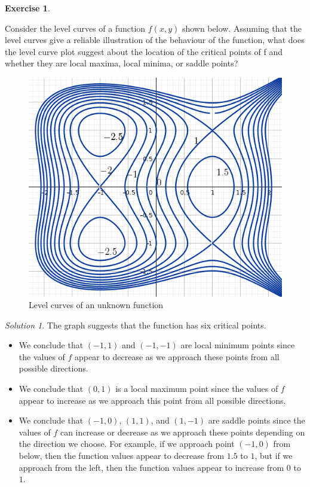 \documentclass[
]{book}
\providecommand{\tightlist}{%
  \setlength{\itemsep}{0pt}\setlength{\parskip}{0pt}}
\theoremstyle{definition}
\theoremstyle{definition}
\theoremstyle{definition}
\newtheorem{exercise}{Exercise}[chapter]
\theoremstyle{definition}
\theoremstyle{remark}
\newtheorem*{solution}{Solution}
\begin{document}
\begin{exercise}
\protect\hypertarget{exr:unlabeled-div-63}{}\label{exr:unlabeled-div-63}

Consider the level curves of a function \(f(x, y)\) shown below. Assuming that the level curves give a reliable illustration of the behaviour of the function, what does the level curve plot suggest about the location of the critical points of f and whether they are local maxima, local minima, or saddle points?

\begin{figure}

{\centering \includegraphics[width=0.4\linewidth]{images/lc-new} 

}

\caption{Level curves of an unknown function}\label{fig:unnamed-chunk-16}
\end{figure}

\end{exercise}

\begin{solution}

The graph suggests that the function has six critical points.

\begin{itemize}
\tightlist
\item
  We conclude that \((-1,1)\) and \((-1,-1)\) are local minimum points since the values of \(f\) appear to decrease as we approach these points from all possible directions.
\item
  We conclude that \((0,1)\) is a local maximum point since the values of \(f\) appear to increase as we approach this point from all possible directions.
\item
  We conclude that \((-1,0)\), \((1,1)\), and \((1,-1)\) are saddle points since the values of \(f\) can increase or decrease as we approach these points depending on the direction we choose. For example, if we approach point \((-1,0)\) from below, then the function values appear
  to decrease from \(1.5\) to \(1\), but if we approach from the left, then the function values appear to increase from \(0\) to \(1\).
\end{itemize}

\end{solution}
\end{document}
